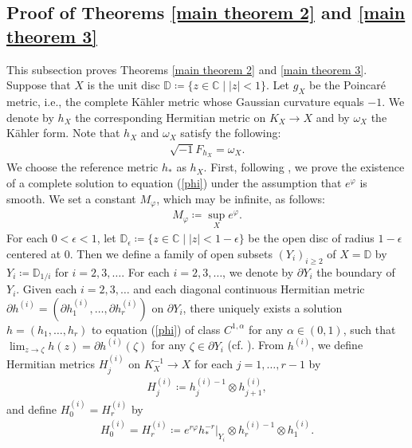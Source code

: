 \documentclass[12pt]{article}
\theoremstyle{definition}
\def\refe{\ast}
\def\C{{\mathbb C}}
\def\D{{\mathbb D}}
\def\inum{{\sqrt{-1}}}
\begin{document}
\subsection{Proof of Theorems \ref{main theorem 2} and \ref{main theorem 3}}
This subsection proves Theorems \ref{main theorem 2} and \ref{main theorem 3}. Suppose that $X$ is the unit disc $\D\coloneqq \{z\in\C\mid |z|<1\}$. Let $g_X$ be the Poincar\'e metric, i.e., the complete K\"ahler metric whose Gaussian curvature equals $-1$. We denote by $h_X$ the corresponding Hermitian metric on $K_X\rightarrow X$ and by $\omega_X$ the K\"ahler form. Note that $h_X$ and $\omega_X$ satisfy the following:
\begin{align*}
\inum F_{h_X}=\omega_X.
\end{align*}
We choose the reference metric $h_\refe$ as $h_X$. First, following \cite[Section 5]{LM1}, we prove the existence of a complete solution to equation (\ref{phi}) under the assumption that $e^\varphi$ is smooth. We set a constant $M_\varphi$, which may be infinite, as follows:
\begin{align*}
M_\varphi\coloneqq \sup_X e^{\varphi}.
\end{align*}
For each $0<\epsilon<1$, let $\D_\epsilon\coloneqq \{z\in\C\mid |z|<1-\epsilon\}$ be the open disc of radius $1-\epsilon$ centered at $0$. Then we define a family of open subsets $(Y_i)_{i\geq 2}$ of $X=\D$ by $Y_i\coloneqq \D_{1/i}$ for $i=2,3,\dots$. For each $i=2,3,\dots$, we denote by $\partial Y_i$ the boundary of $Y_i$. Given each $i=2,3,\dots$ and each diagonal continuous Hermitian metric $\partial h^{(i)}=(\partial h_1^{(i)},\dots, \partial h_r^{(i)})$ on $\partial Y_i$, there uniquely exists a solution $h=(h_1,\dots, h_r)$ to equation (\ref{phi}) of class $C^{1,\alpha}$ for any $\alpha\in (0,1)$, such that $\lim_{z\to\zeta}h(z)=\partial h^{(i)}(\zeta)$ for any $\zeta\in \partial Y_i$ (cf. \cite{Miy3}). From $h^{(i)}$, we define Hermitian metrics $H_j^{(i)}$ on $K_X^{-1} \to X$ for each $j=1,\dots, r-1$ by
\begin{align*}
H_j^{(i)}\coloneqq h_j^{(i)-1}\otimes h_{j+1}^{(i)},
\end{align*}
and define $H_0^{(i)}=H_r^{(i)}$ by
\begin{align*}
H_0^{(i)} = H_r^{(i)} \coloneqq e^{r\varphi} h_\refe^{-r}|_{Y_i} \otimes h_r^{(i)-1} \otimes h_1^{(i)}.
\end{align*}
\end{document}
